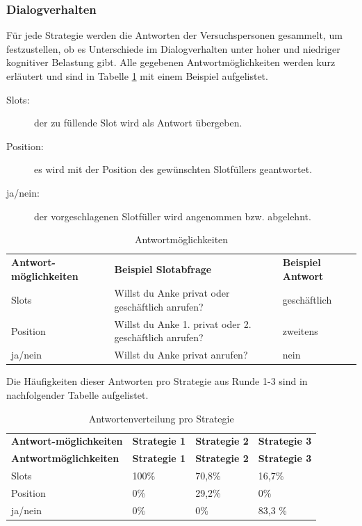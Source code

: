 \documentclass[12pt,a4paper]{scrartcl}
\begin{document}
\subsubsection{Dialogverhalten}
\label{disverh1}
Für jede Strategie werden die Antworten der Versuchspersonen gesammelt, um festzustellen, ob es Unterschiede im Dialogverhalten unter hoher und niedriger kognitiver Belastung gibt. Alle gegebenen Antwortmöglichkeiten werden kurz erläutert und sind in Tabelle \ref{Dialogverhalten11} mit einem Beispiel aufgelistet.

\begin{description}
\item[Slots:] der zu füllende Slot wird als Antwort übergeben.
\item[Position:] es wird mit der Position des gewünschten Slotfüllers geantwortet.
\item[ja/nein:] der vorgeschlagenen Slotfüller wird angenommen bzw. abgelehnt.
\end{description}

\begin{longtable}{p{}p{5cm}p{}}
	\label{Dialogverhalten11}\\
	\caption[Antwortmöglichkeiten1]{Antwortmöglichkeiten}\\
	\hline
\textbf{Antwort-möglichkeiten}&\textbf{Beispiel \newline Slotabfrage}&\textbf{Beispiel \newline Antwort}\\
	\hline
Slots  & Willst du Anke privat oder geschäftlich anrufen? & geschäftlich  \\
Position & Willst du Anke 1. privat oder 2. geschäftlich anrufen? & zweitens  \\
ja/nein & Willst du Anke privat anrufen? &  nein\\ 
\hline
\end{longtable}

Die Häufigkeiten dieser Antworten pro Strategie aus Runde 1-3 sind in nachfolgender Tabelle aufgelistet.

\begin{longtable}{p{3cm}p{3cm}p{3cm}p{3cm} }
	\label{Dialogverhalten12}\\
	\caption[Antwortenverteilung pro Strategie]{Antwortenverteilung pro Strategie}\\
	\hline
\textbf{Antwort-möglichkeiten}&\textbf{Strategie 1}&\textbf{Strategie 2} &\textbf{Strategie 3}\\
	\hline
	\endfirsthead
	\hline
	\textbf{Antwortmöglichkeiten}&\textbf{Strategie 1}&\textbf{Strategie 2} &\textbf{Strategie 3}\\
	\hline
	\endhead
Slots & 100\% & 70,8\%\ & 16,7\%  \\
Position & 0\% & 29,2\% & 0\%  \\
ja/nein & 0\% & 0\%  & 83,3 \%  \\
\hline
\end{longtable}
\end{document}
